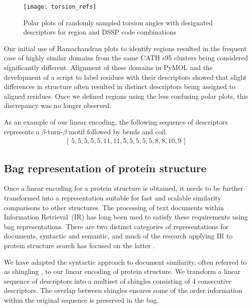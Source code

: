 \documentclass[a4,center,fleqn]{NAR}
\begin{document}
\begin{figure*}[tb]
\begin{center}
\texttt{[image: torsion\_refs]}
\end{center}
\caption{Polar plots of randomly sampled torsion angles with designated descriptors for region and DSSP code combinations}
\label{fig:torsion_refs}
\end{figure*}

Our initial use of Ramachandran plots to identify regions resulted in the frequent case of highly similar domains from the same CATH s95 clusters being considered significantly different. 
Alignment of these domains in PyMOL \cite{PyMOL} and the development of a script to label residues with their descriptors showed that slight differences in structure often resulted in distinct descriptors being assigned to aligned residues. 
Once we defined regions using the less confusing polar plots, this discrepancy was no longer observed. 

As an example of our linear encoding, the following sequence of descriptors represents a $\beta$-turn-$\beta$ motif followed by bends and coil.
\begin{gather}\label{E:descrseq} 
    [\, 5, 5, 5, 5, 5, 11, 11, 5, 5, 5, 5, 5, 8, 8, 10, 9 \,]
\end{gather}

\subsection{Bag representation of protein structure}

Once a linear encoding for a protein structure is obtained, it needs to be further transformed into a representation suitable for fast and scalable similarity comparisons to other structures.
The processing of text documents within Information Retrieval~(IR) has long been used to satisfy these requirements using bag representations.
There are two distinct categories of representations for documents, syntactic and semantic, and much of the research applying IR to protein structure search has focused on the latter \cite{Aungand2004,Zhang2010,Budowski2010}. 

We have adapted the syntactic approach to document similarity, often referred to as shingling \cite{Broder1997a}, to our linear encoding of protein structure. 
We transform a linear sequence of descriptors into a multiset of shingles consisting of 4 consecutive descriptors.
The overlap between shingles ensures some of the order information within the original sequence is preserved in the bag. 
\end{document}
